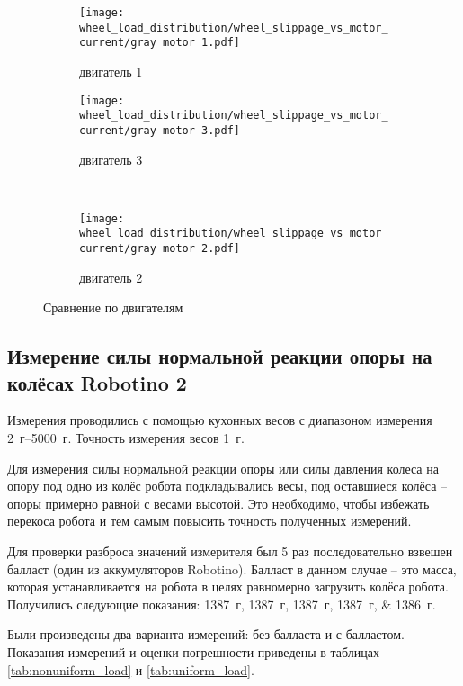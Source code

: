 \begin{figure}[H]
    \centering
    \begin{subfigure}{0.49\textwidth}
        \centering
        \texttt{[image: wheel\_load\_distribution/wheel\_slippage\_vs\_motor\_current/gray motor 1.pdf]}
        \caption{двигатель 1}
    \end{subfigure}
    \hspace{0.005\textwidth}
    \begin{subfigure}{0.49\textwidth}
        \centering
        \texttt{[image: wheel\_load\_distribution/wheel\_slippage\_vs\_motor\_current/gray motor 3.pdf]}
        \caption{двигатель 3}
    \end{subfigure} \\
    \vspace{4pt}
    \centering
    \begin{subfigure}{0.49\textwidth}
        \centering
        \texttt{[image: wheel\_load\_distribution/wheel\_slippage\_vs\_motor\_current/gray motor 2.pdf]}
        \caption{двигатель 2}
    \end{subfigure}
    \caption{Сравнение по двигателям}
\end{figure}

\subsection{Измерение силы нормальной реакции опоры на колёсах Robotino 2}

Измерения проводились с помощью кухонных весов с диапазоном измерения \qtyrange{2}{5000}{г}.
Точность измерения весов \qty{1}{г}.

Для измерения силы нормальной реакции опоры или силы давления колеса на опору под одно из колёс робота подкладывались весы, под оставшиеся колёса -- опоры примерно равной с весами высотой.
Это необходимо, чтобы избежать перекоса робота и тем самым повысить точность полученных измерений.

Для проверки разброса значений измерителя был \num{5} раз последовательно взвешен балласт (один из аккумуляторов Robotino).
Балласт в данном случае -- это масса, которая устанавливается на робота в целях равномерно загрузить колёса робота.
Получились следующие показания: \qtylist{1387;1387;1387;1387;1386}{г}.

Были произведены два варианта измерений: без балласта и с балластом.
Показания измерений и оценки погрешности приведены в таблицах \ref{tab:nonuniform_load} и \ref{tab:uniform_load}.

